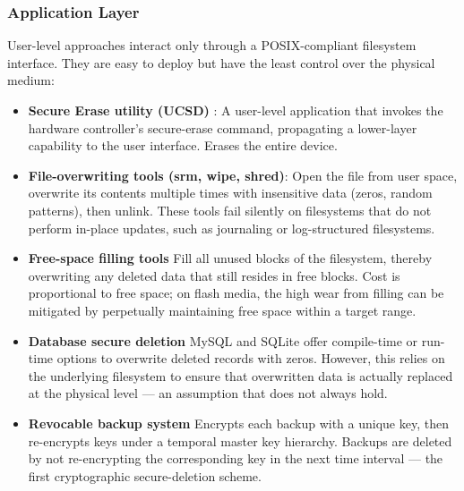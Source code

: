 \subsubsection{Application Layer}
User-level approaches interact only through a POSIX-compliant filesystem interface. They are easy to 
deploy but have the least control over the physical medium:
\begin{itemize}
    \item \textbf{Secure Erase utility (UCSD)} : A user-level application that invokes the hardware 
    controller's secure-erase command, propagating a lower-layer capability to the user interface. 
    Erases the entire device.

    \item \textbf{File-overwriting tools (srm, wipe, shred)}: Open the file from user space, overwrite 
    its contents multiple times with insensitive data (zeros, random patterns), then unlink. These tools 
    fail silently on filesystems that do not perform in-place updates, such as journaling or 
    log-structured filesystems.

    \item \textbf{Free-space filling tools} Fill all unused blocks of the filesystem, thereby 
    overwriting any deleted data that still resides in free blocks. Cost is proportional to free space; 
    on flash media, the high wear from filling can be mitigated by perpetually maintaining free space 
    within a target range.

    \item \textbf{Database secure deletion} MySQL and SQLite offer compile-time or run-time options to 
    overwrite deleted records with zeros. However, this relies on the underlying filesystem to ensure 
    that overwritten data is actually replaced at the physical level — an assumption that does not always 
    hold.

    \item \textbf{Revocable backup system} Encrypts each backup with a unique key, then re-encrypts keys 
    under a temporal master key hierarchy. Backups are deleted by not re-encrypting the corresponding 
    key in the next time interval — the first cryptographic secure-deletion scheme.
\end{itemize}
